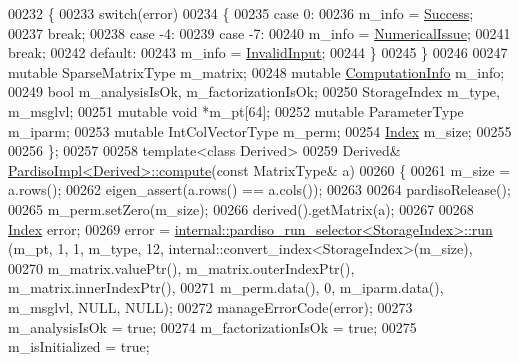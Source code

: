\begin{DoxyCode}
00232 \textcolor{keyword}{    }\{
00233       \textcolor{keywordflow}{switch}(error)
00234       \{
00235         \textcolor{keywordflow}{case} 0:
00236           m\_info = \hyperlink{group__enums_gga85fad7b87587764e5cf6b513a9e0ee5ea52581b035f4b59c203b8ff999ef5fcea}{Success};
00237           \textcolor{keywordflow}{break};
00238         \textcolor{keywordflow}{case} -4:
00239         \textcolor{keywordflow}{case} -7:
00240           m\_info = \hyperlink{group__enums_gga85fad7b87587764e5cf6b513a9e0ee5eaaf9b736d310a664e7729d163a035cc5f}{NumericalIssue};
00241           \textcolor{keywordflow}{break};
00242         \textcolor{keywordflow}{default}:
00243           m\_info = \hyperlink{group__enums_gga85fad7b87587764e5cf6b513a9e0ee5ea945604f62795ffc70aedf2bd12ea0434}{InvalidInput};
00244       \}
00245     \}
00246 
00247     \textcolor{keyword}{mutable} SparseMatrixType m\_matrix;
00248     \textcolor{keyword}{mutable} \hyperlink{group__enums_ga85fad7b87587764e5cf6b513a9e0ee5e}{ComputationInfo} m\_info;
00249     \textcolor{keywordtype}{bool} m\_analysisIsOk, m\_factorizationIsOk;
00250     StorageIndex m\_type, m\_msglvl;
00251     \textcolor{keyword}{mutable} \textcolor{keywordtype}{void} *m\_pt[64];
00252     \textcolor{keyword}{mutable} ParameterType m\_iparm;
00253     \textcolor{keyword}{mutable} IntColVectorType m\_perm;
00254     \hyperlink{namespace_eigen_a62e77e0933482dafde8fe197d9a2cfde}{Index} m\_size;
00255     
00256 \};
00257 
00258 \textcolor{keyword}{template}<\textcolor{keyword}{class} Derived>
00259 Derived& \hyperlink{class_eigen_1_1_pardiso_impl}{PardisoImpl<Derived>::compute}(\textcolor{keyword}{const} MatrixType& a)
00260 \{
00261   m\_size = a.rows();
00262   eigen\_assert(a.rows() == a.cols());
00263 
00264   pardisoRelease();
00265   m\_perm.setZero(m\_size);
00266   derived().getMatrix(a);
00267   
00268   \hyperlink{namespace_eigen_a62e77e0933482dafde8fe197d9a2cfde}{Index} error;
00269   error = \hyperlink{struct_eigen_1_1internal_1_1pardiso__run__selector}{internal::pardiso\_run\_selector<StorageIndex>::run}
      (m\_pt, 1, 1, m\_type, 12, internal::convert\_index<StorageIndex>(m\_size),
00270                                                             m\_matrix.valuePtr(), m\_matrix.outerIndexPtr(), 
      m\_matrix.innerIndexPtr(),
00271                                                             m\_perm.data(), 0, m\_iparm.data(), m\_msglvl, 
      NULL, NULL);
00272   manageErrorCode(error);
00273   m\_analysisIsOk = \textcolor{keyword}{true};
00274   m\_factorizationIsOk = \textcolor{keyword}{true};
00275   m\_isInitialized = \textcolor{keyword}{true};

\end{DoxyCode}
